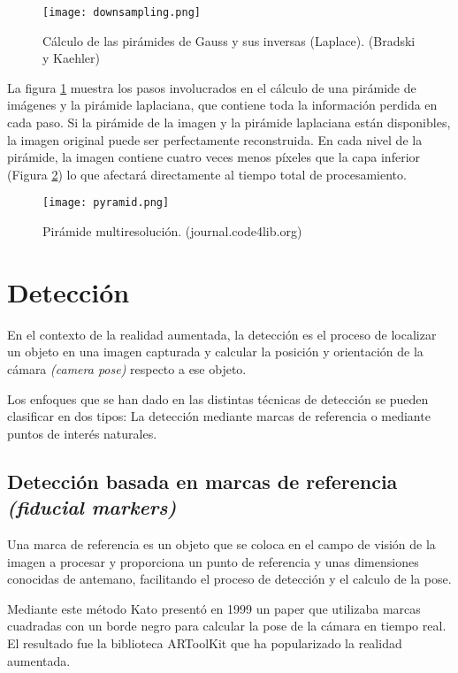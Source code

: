 \begin{figure}[h!] 
  \centering
  \texttt{[image: downsampling.png]}
  \caption{Cálculo de las pirámides de Gauss y sus inversas (Laplace). (Bradski y Kaehler)}

  \label{fig:pirámides}
\end{figure}

La figura \ref{fig:pirámides} muestra los pasos involucrados en el cálculo de una pirámide de imágenes y la pirámide laplaciana, que contiene toda la información perdida en cada paso. Si la pirámide de la imagen y la pirámide laplaciana están disponibles, la imagen original puede ser perfectamente reconstruida. En cada nivel de la pirámide, la imagen contiene cuatro veces menos píxeles que la capa inferior (Figura \ref{fig:pirescale}) lo que afectará directamente al tiempo total de procesamiento. 

\begin{figure}[h!]
  \centering
  \texttt{[image: pyramid.png]}
  \caption{Pirámide multiresolución. (journal.code4lib.org)}
  \label{fig:pirescale}
\end{figure}

\section{Detección}
En el contexto de la realidad aumentada, la detección es el proceso de localizar un objeto en una imagen capturada y calcular la posición y orientación de la cámara \emph{(camera pose)} respecto a ese objeto.

Los enfoques que se han dado en las distintas técnicas de detección se pueden clasificar en dos tipos: La detección mediante marcas de referencia o mediante puntos de interés naturales.

\subsection{Detección basada en marcas de referencia \emph{(fiducial markers)}}
Una marca de referencia es un objeto que se coloca en el campo de visión de la imagen a procesar y proporciona un punto de referencia y unas dimensiones conocidas de antemano, facilitando el proceso de detección y el calculo de la pose.

Mediante este método Kato presentó en 1999 un paper que utilizaba marcas cuadradas con un borde negro para calcular la pose de la cámara en tiempo real\cite{Kato}. El resultado fue la biblioteca ARToolKit que ha popularizado la realidad aumentada.


